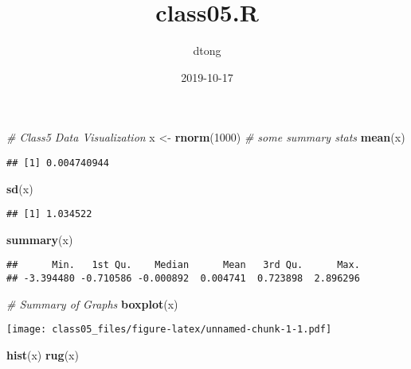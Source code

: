 \documentclass[]{article}
\title{class05.R}
\author{dtong}
\date{2019-10-17}
\newenvironment{Shaded}{\begin{snugshade}}{\end{snugshade}}
\newcommand{\CommentTok}[1]{\textcolor[rgb]{0.56,0.35,0.01}{\textit{#1}}}
\newcommand{\DecValTok}[1]{\textcolor[rgb]{0.00,0.00,0.81}{#1}}
\newcommand{\KeywordTok}[1]{\textcolor[rgb]{0.13,0.29,0.53}{\textbf{#1}}}
\newcommand{\NormalTok}[1]{#1}
\newcommand{\StringTok}[1]{\textcolor[rgb]{0.31,0.60,0.02}{#1}}
\begin{document}
\maketitle

\begin{Shaded}
\begin{Highlighting}[]
\CommentTok{# Class5 Data Visualization}
\NormalTok{x <-}\StringTok{ }\KeywordTok{rnorm}\NormalTok{(}\DecValTok{1000}\NormalTok{)}
\CommentTok{# some summary stats}
\KeywordTok{mean}\NormalTok{(x)}
\end{Highlighting}
\end{Shaded}

\begin{verbatim}
## [1] 0.004740944
\end{verbatim}

\begin{Shaded}
\begin{Highlighting}[]
\KeywordTok{sd}\NormalTok{(x)}
\end{Highlighting}
\end{Shaded}

\begin{verbatim}
## [1] 1.034522
\end{verbatim}

\begin{Shaded}
\begin{Highlighting}[]
\KeywordTok{summary}\NormalTok{(x)}
\end{Highlighting}
\end{Shaded}

\begin{verbatim}
##      Min.   1st Qu.    Median      Mean   3rd Qu.      Max. 
## -3.394480 -0.710586 -0.000892  0.004741  0.723898  2.896296
\end{verbatim}

\begin{Shaded}
\begin{Highlighting}[]
\CommentTok{# Summary of Graphs}
\KeywordTok{boxplot}\NormalTok{(x)}
\end{Highlighting}
\end{Shaded}

\texttt{[image: class05\_files/figure-latex/unnamed-chunk-1-1.pdf]}

\begin{Shaded}
\begin{Highlighting}[]
\KeywordTok{hist}\NormalTok{(x)}
\KeywordTok{rug}\NormalTok{(x)}
\end{Highlighting}
\end{Shaded}
\end{document}
